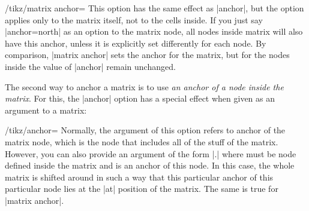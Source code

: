\begin{key}{/tikz/matrix anchor=}
  This option has the same effect as |anchor|, but the option applies
  only to the matrix itself, not to the cells inside. If you just say
  |anchor=north| as an option to the matrix node, all nodes inside
  matrix will also have this anchor, unless it is explicitly set
  differently for each node. By comparison, |matrix anchor| sets the
  anchor for the matrix, but for the nodes inside the value of
  |anchor| remain unchanged.

\begin{codeexample}[]
\end{codeexample}
\end{key}

The second way to anchor a matrix is to use \emph{an anchor of a node
  inside the matrix}. For this, the |anchor| option has a special
effect when given as an argument to a matrix:

\begin{key}{/tikz/anchor=}
  Normally, the argument of this option refers to anchor of the matrix
  node, which is the node that includes all of the stuff of the
  matrix. However, you can also provide an argument of the form
  |.| where  must be node defined
  inside the matrix and  is an anchor of this node. In
  this case, the whole matrix is shifted around in such a way that
  this particular anchor of this particular node lies at the |at|
  position of the matrix. The same is true for |matrix anchor|.

\begin{codeexample}[]
\end{codeexample}
\end{key}



